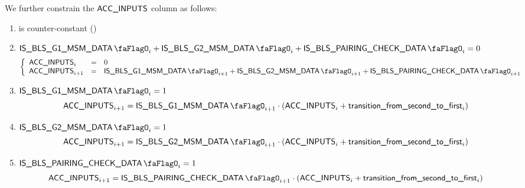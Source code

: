 We further constrain the $\textsf{ACC\_INPUTS}$ column as follows:
\begin{enumerate}
    \item \accInputs{} is counter-constant \quad (\trash)

    \item \If $\isBlsGOneMsmData_{i} + \isBlsGTwoMsmData_{i} + \isBlsPairingCheckData_{i} = 0$ ~\Then
        \[
            \left\{ \begin{array}{lcl}
                \accInputs_{i}     & = & 0                        \\
                \accInputs_{i + 1} & = & \isBlsGOneMsmData_{i + 1} + \isBlsGTwoMsmData_{i + 1} + \isBlsPairingCheckData_{i + 1} \\
            \end{array} \right.
        \]
    
    \item \If $\isBlsGOneMsmData_{i} = 1$ \Then
        \[
            \accInputs_{i+1}
            =
            \isBlsGOneMsmData_{i+1} \cdot (\accInputs_{i} + \locTransitionFromSecondToFirst_{i})
        \]

    \item \If $\isBlsGTwoMsmData_{i} = 1$ \Then
        \[
            \accInputs_{i+1}
            =
            \isBlsGTwoMsmData_{i+1} \cdot (\accInputs_{i} + \locTransitionFromSecondToFirst_{i})
        \]

    \item \If $\isBlsPairingCheckData_{i} = 1$ \Then
        \[
            \accInputs_{i+1}
            =
            \isBlsPairingCheckData_{i+1} \cdot (\accInputs_{i} + \locTransitionFromSecondToFirst_{i})
        \]
\end{enumerate}